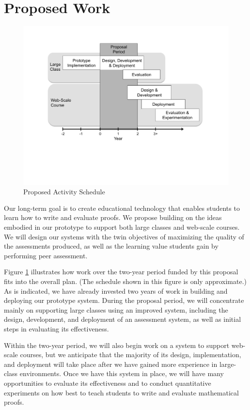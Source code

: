 \documentclass[12pt]{article}
\begin{document}
\section{Proposed Work}

\begin{figure}[ht]
\begin{center}
\includegraphics[scale=0.7]{schedule}
\end{center}
\caption{Proposed Activity Schedule}
\label{fig:schedule}
\end{figure}


Our long-term goal is to create educational technology that enables
students to learn how to write and evaluate proofs.  We propose
building on the ideas embodied in our prototype to support both large
classes and web-scale courses.  We will design our systems with the
twin objectives of maximizing the quality of the assessments produced, as
well as the learning value students gain by performing peer assessment.

Figure \ref{fig:schedule} illustrates how work over the two-year
period funded by this proposal fits into the overall plan.  (The
schedule shown in this figure is only approximate.)  As is indicated,
we have already invested two years of work in building and deploying
our prototype system.  During the proposal period, we will concentrate
mainly on supporting large classes using an improved system, including
the design, development, and deployment of an assessment system,
as well as initial steps in evaluating its
effectiveness.

Within the two-year period,
we will also begin work on a system to support
web-scale courses, but we anticipate that the majority of its design,
implementation, and deployment will take place after we
have gained more experience in large-class environments.  Once we have
this system in place, we will have many opportunities to evaluate its
effectiveness and to conduct quantitative experiments on how best to
teach students to write and evaluate mathematical proofs.
\end{document}
